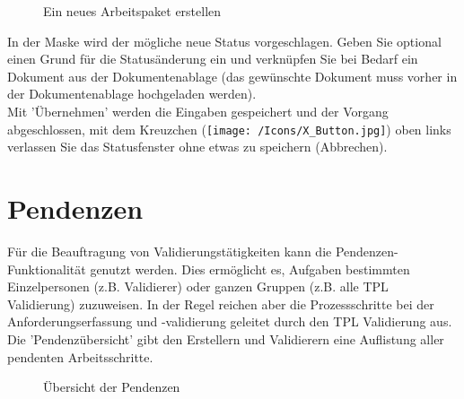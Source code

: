 \begin{figure}[H]
\caption{Ein neues Arbeitspaket erstellen}
\end{figure}

In der Maske wird der mögliche neue Status vorgeschlagen. Geben Sie optional einen Grund für die Statusänderung ein und verknüpfen Sie bei Bedarf ein Dokument aus der Dokumentenablage (das gewünschte Dokument muss vorher in der Dokumentenablage hochgeladen werden).\\
Mit 'Übernehmen' werden die Eingaben gespeichert und der Vorgang abgeschlossen, mit dem Kreuzchen (\texttt{[image: /Icons/X\_Button.jpg]}) oben links verlassen Sie das Statusfenster ohne etwas zu speichern (Abbrechen).

\section{Pendenzen}

Für die Beauftragung von Validierungstätigkeiten kann die Pendenzen-Funktionalität genutzt werden. Dies ermöglicht es, Aufgaben bestimmten Einzelpersonen (z.B. Validierer) oder ganzen Gruppen (z.B. alle TPL Validierung) zuzuweisen. In der Regel reichen aber die Prozessschritte bei der Anforderungserfassung und -validierung geleitet durch den TPL Validierung aus. Die 'Pendenzübersicht' gibt den Erstellern und Validierern eine Auflistung aller pendenten Arbeitsschritte. 

\begin{figure}[H]
\caption{Übersicht der Pendenzen}
\end{figure}

